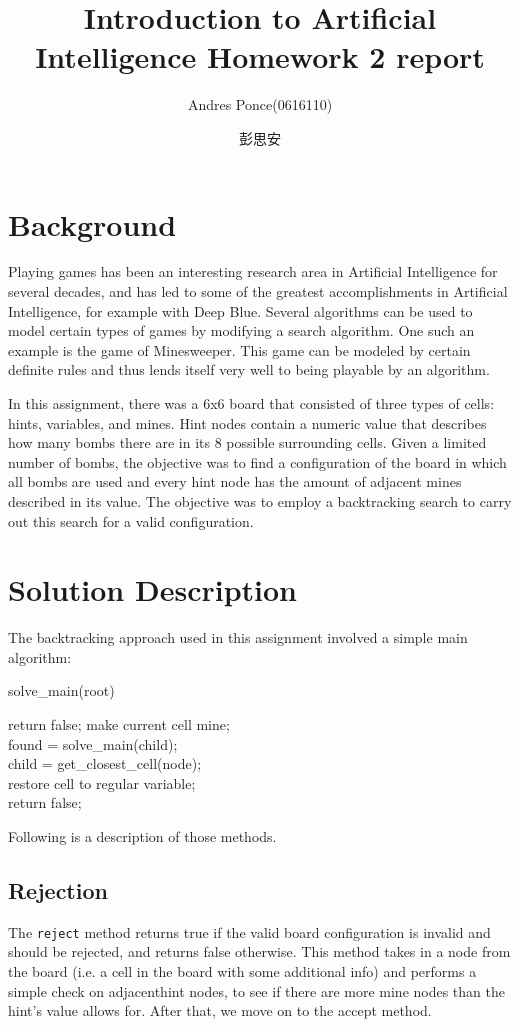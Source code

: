\documentclass{article}
\author{Andres Ponce(0616110) \\
\and
彭思安}
\title{Introduction to Artificial Intelligence Homework 2 report}
\begin{document}
\maketitle
\section{Background}
Playing games has been an interesting research area in Artificial Intelligence
for several decades, and has led to some of the greatest accomplishments in Artificial
Intelligence, for example with Deep Blue. Several algorithms can be used to model certain types of games 
by modifying a search algorithm. One such an example is the game of Minesweeper. This game can 
be modeled by certain definite rules and thus lends itself very well to being playable by an algorithm.

In this assignment, there was a 6x6 board that consisted of three types of cells: hints, variables, and mines.
Hint nodes contain a numeric value that describes how many bombs there are in its 8 possible surrounding cells.
Given a limited number of bombs, the objective was to find a configuration of the board in which all bombs are used
and every hint node has the amount of adjacent mines described in its value. The objective was to employ
a backtracking search to carry out this search for a valid configuration. 

\section{Solution Description}
The backtracking approach used in this assignment involved a simple main algorithm:

\begin{algorithm}[H]
		\caption{solve\_main(root)}
		{
			return false;
		}
		make current cell mine;\\
		{
			found = solve\_main(child);\\
			child = get\_closest\_cell(node);\\
		}
		restore cell to regular variable;\\
		return false;\\
\end{algorithm}
Following is a description of those methods.
\subsection{Rejection}
The \texttt{reject} method returns true if the valid board configuration is invalid and should be rejected, and
returns false otherwise. This method takes in a node from the board (i.e. a cell in the board with some 
additional info) and performs a simple check on adjacenthint nodes, to see if there are more mine nodes than 
the hint's value allows for. After that, we move on to the accept method.
\end{document}
